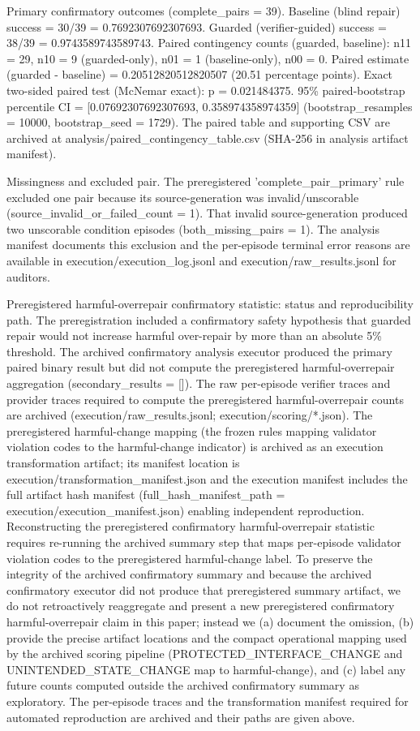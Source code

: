 \documentclass[conference]{IEEEtran}
\begin{document}
Primary confirmatory outcomes (complete\_pairs = 39). Baseline (blind repair) success = 30/39 = 0.7692307692307693. Guarded (verifier-guided) success = 38/39 = 0.9743589743589743. Paired contingency counts (guarded, baseline): n11 = 29, n10 = 9 (guarded-only), n01 = 1 (baseline-only), n00 = 0. Paired estimate (guarded - baseline) = 0.20512820512820507 (20.51 percentage points). Exact two-sided paired test (McNemar exact): p = 0.021484375. 95\% paired-bootstrap percentile CI = [0.07692307692307693, 0.358974358974359] (bootstrap\_resamples = 10000, bootstrap\_seed = 1729). The paired table and supporting CSV are archived at analysis/paired\_contingency\_table.csv (SHA-256 in analysis artifact manifest).

Missingness and excluded pair. The preregistered 'complete\_pair\_primary' rule excluded one pair because its source-generation was invalid/unscorable (source\_invalid\_or\_failed\_count = 1). That invalid source-generation produced two unscorable condition episodes (both\_missing\_pairs = 1). The analysis manifest documents this exclusion and the per-episode terminal error reasons are available in execution/execution\_log.jsonl and execution/raw\_results.jsonl for auditors.

Preregistered harmful-overrepair confirmatory statistic: status and reproducibility path. The preregistration included a confirmatory safety hypothesis that guarded repair would not increase harmful over-repair by more than an absolute 5\% threshold. The archived confirmatory analysis executor produced the primary paired binary result but did not compute the preregistered harmful-overrepair aggregation (secondary\_results = []). The raw per-episode verifier traces and provider traces required to compute the preregistered harmful-overrepair counts are archived (execution/raw\_results.jsonl; execution/scoring/*.json). The preregistered harmful-change mapping (the frozen rules mapping validator violation codes to the harmful-change indicator) is archived as an execution transformation artifact; its manifest location is execution/transformation\_manifest.json and the execution manifest includes the full artifact hash manifest (full\_hash\_manifest\_path = execution/execution\_manifest.json) enabling independent reproduction. Reconstructing the preregistered confirmatory harmful-overrepair statistic requires re-running the archived summary step that maps per-episode validator violation codes to the preregistered harmful-change label. To preserve the integrity of the archived confirmatory summary and because the archived confirmatory executor did not produce that preregistered summary artifact, we do not retroactively reaggregate and present a new preregistered confirmatory harmful-overrepair claim in this paper; instead we (a) document the omission, (b) provide the precise artifact locations and the compact operational mapping used by the archived scoring pipeline (PROTECTED\_INTERFACE\_CHANGE and UNINTENDED\_STATE\_CHANGE map to harmful-change), and (c) label any future counts computed outside the archived confirmatory summary as exploratory. The per-episode traces and the transformation manifest required for automated reproduction are archived and their paths are given above.
\end{document}
